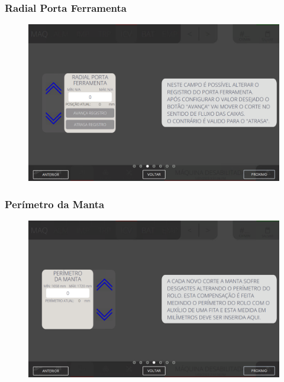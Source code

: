 \newpage
\thispagestyle{fancy}
\vspace*{40 pt}
\subsubsection{\small{Radial Porta Ferramenta}} \label{sec:telaAjustesCorteEVincoRadialPortaFerramenta} 
\vspace*{\fill}
\begin{figure}[h]
    \centering
    \includegraphics[width=576 px,height=360 px]{src/imagesICV/06-dryCutter/settings/e-3.png}
\end{figure}
\vspace*{\fill}

\newpage
\thispagestyle{fancy}
\vspace*{40 pt}
\subsubsection{\small{Perímetro da Manta}} \label{sec:telaAjustesCorteEVincoPerimetroManta}
\vspace*{\fill}
\begin{figure}[h]
    \centering
    \includegraphics[width=576 px,height=360 px]{src/imagesICV/06-dryCutter/settings/e-4.png}
\end{figure}
\vspace*{\fill}

